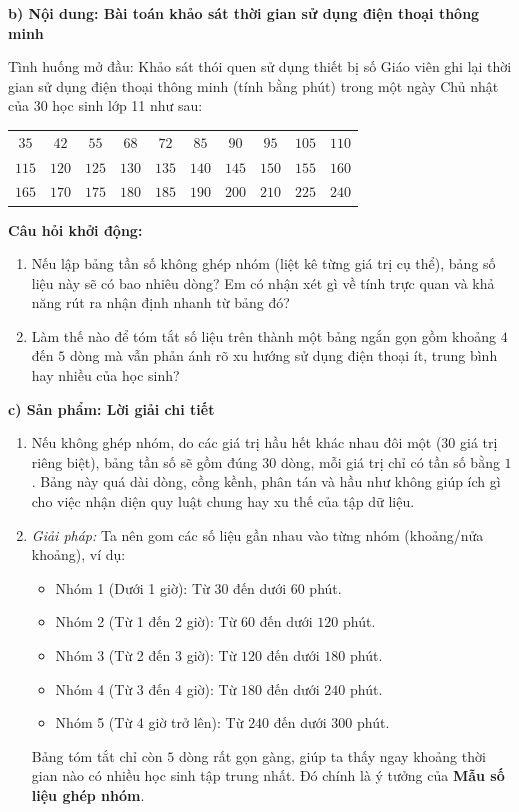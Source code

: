 \documentclass[12pt, a4paper]{article}
\begin{document}
\noindent \textbf{b) Nội dung: Bài toán khảo sát thời gian sử dụng điện thoại thông minh}
\begin{pedabox}{Tình huống mở đầu: Khảo sát thói quen sử dụng thiết bị số}
Giáo viên ghi lại thời gian sử dụng điện thoại thông minh (tính bằng phút) trong một ngày Chủ nhật của $30$ học sinh lớp 11 như sau:
\begin{center}
\small
\begin{tabular}{|cccccccccc|}
\hline
$35$ & $42$ & $55$ & $68$ & $72$ & $85$ & $90$ & $95$ & $105$ & $110$ \\
$115$ & $120$ & $125$ & $130$ & $135$ & $140$ & $145$ & $150$ & $155$ & $160$ \\
$165$ & $170$ & $175$ & $180$ & $185$ & $190$ & $200$ & $210$ & $225$ & $240$ \\
\hline
\end{tabular}
\end{center}
\textbf{Câu hỏi khởi động:}
\begin{enumerate}[leftmargin=0.6cm]
    \item Nếu lập bảng tần số không ghép nhóm (liệt kê từng giá trị cụ thể), bảng số liệu này sẽ có bao nhiêu dòng? Em có nhận xét gì về tính trực quan và khả năng rút ra nhận định nhanh từ bảng đó?
    \item Làm thế nào để tóm tắt số liệu trên thành một bảng ngắn gọn gồm khoảng $4$ đến $5$ dòng mà vẫn phản ánh rõ xu hướng sử dụng điện thoại ít, trung bình hay nhiều của học sinh?
\end{enumerate}
\end{pedabox}

\noindent \textbf{c) Sản phẩm: Lời giải chi tiết}
\begin{enumerate}[leftmargin=0.6cm]
    \item Nếu không ghép nhóm, do các giá trị hầu hết khác nhau đôi một ($30$ giá trị riêng biệt), bảng tần số sẽ gồm đúng $30$ dòng, mỗi giá trị chỉ có tần số bằng $1$. Bảng này quá dài dòng, cồng kềnh, phân tán và hầu như không giúp ích gì cho việc nhận diện quy luật chung hay xu thế của tập dữ liệu.
    \item \textit{Giải pháp:} Ta nên gom các số liệu gần nhau vào từng nhóm (khoảng/nửa khoảng), ví dụ:
    \begin{itemize}
        \item Nhóm 1 (Dưới 1 giờ): Từ $30$ đến dưới $60$ phút.
        \item Nhóm 2 (Từ 1 đến 2 giờ): Từ $60$ đến dưới $120$ phút.
        \item Nhóm 3 (Từ 2 đến 3 giờ): Từ $120$ đến dưới $180$ phút.
        \item Nhóm 4 (Từ 3 đến 4 giờ): Từ $180$ đến dưới $240$ phút.
        \item Nhóm 5 (Từ 4 giờ trở lên): Từ $240$ đến dưới $300$ phút.
    \end{itemize}
    Bảng tóm tắt chỉ còn $5$ dòng rất gọn gàng, giúp ta thấy ngay khoảng thời gian nào có nhiều học sinh tập trung nhất. Đó chính là ý tưởng của \textbf{Mẫu số liệu ghép nhóm}.
\end{enumerate}
\end{document}
